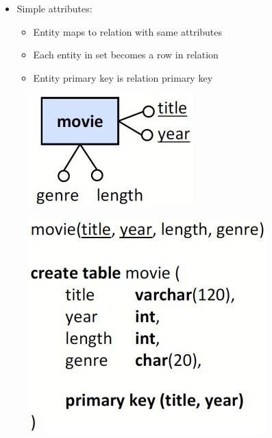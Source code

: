 \documentclass[conference]{IEEEtran}
\begin{document}
\begin{itemize}
    \item Simple attributes: 
    \begin{itemize}
        \item Entity maps to relation with same attributes 
        \item Each entity in set becomes a row in relation 
        \item Entity primary key is relation primary key 
    \end{itemize}
\end{itemize}
\begin{figure} [h!]
    \centering
    \includegraphics[scale=0.5]{Ex18.JPG}
\end{figure}
\begin{figure} [h!]
    \centering
    \includegraphics[scale=0.5]{Ex19.JPG}
\end{figure}

\pagebreak
\end{document}
